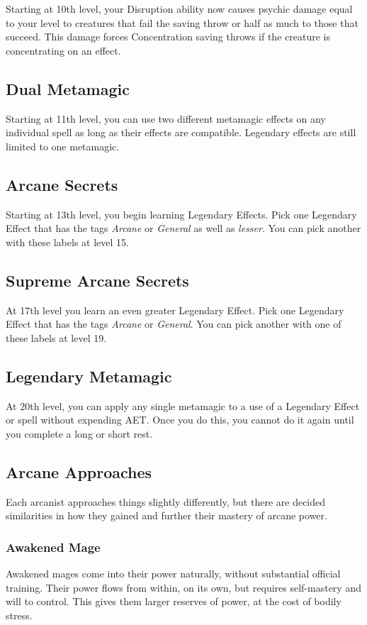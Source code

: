 Starting at 10th level, your Disruption ability now causes psychic damage equal to your level to creatures that fail the saving throw or half as much to those that succeed. This damage forces Concentration saving throws if the creature is concentrating on an effect.

\subsection{Dual Metamagic}

Starting at 11th level, you can use two different metamagic effects on any individual spell as long as their effects are compatible. Legendary effects are still limited to one metamagic.

\subsection{Arcane Secrets}
Starting at 13th level, you begin learning Legendary Effects. Pick one Legendary Effect that has the tags \textit{Arcane} or \textit{General} as well as \textit{lesser}. You can pick another with these labels at level 15.

\subsection{Supreme Arcane Secrets}
At 17th level you learn an even greater Legendary Effect. Pick one Legendary Effect that has the tags \textit{Arcane} or \textit{General}. You can pick another with one of these labels at level 19.

\subsection{Legendary Metamagic}
At 20th level, you can apply any single metamagic to a use of a Legendary Effect or spell without expending AET. Once you do this, you cannot do it again until you complete a long or short rest.

\subsection{Arcane Approaches}

Each arcanist approaches things slightly differently, but there are decided similarities in how they gained and further their mastery of arcane power.

\subsubsection{Awakened Mage}
Awakened mages come into their power naturally, without substantial official training. Their power flows from within, on its own, but requires self-mastery and will to control. This gives them larger reserves of power, at the cost of bodily stress. 

